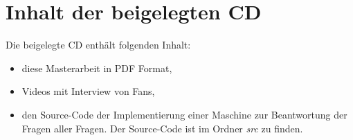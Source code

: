 \documentclass{thesisPST}
\begin{document}
\chapter{Inhalt der beigelegten CD}
Die beigelegte CD enthält folgenden Inhalt:
\begin{itemize}
	\item diese Masterarbeit in PDF Format,
	\item Videos mit Interview von Fans,
	\item den Source-Code der Implementierung einer Maschine zur Beantwortung der Fragen aller Fragen. Der Source-Code ist im Ordner \emph{src} zu finden.
\end{itemize}

\cleardoublepage
{}
{} %

\end{document}
